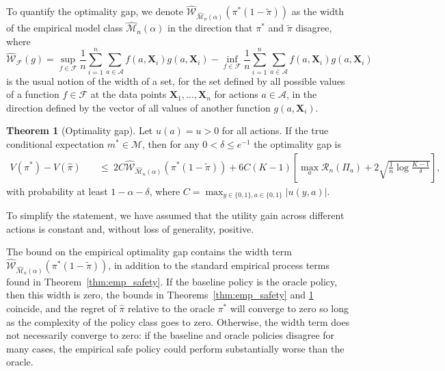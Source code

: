 \documentclass[12pt]{article}
\theoremstyle{definition}
\newtheorem{theorem}{Theorem}
\newcommand{\bX}{\bm X}
\newcommand{\<}{\langle}
\renewcommand{\>}{\rangle}
\newcommand\mcal[1]{\ensuremath{\mathcal{#1}}}
\begin{document}
To quantify the optimality gap, we denote
$\widehat{\mcal{W}}_{\widehat{\mcal{M}}_n(\alpha)}(\pi^\ast(1-\tilde{\pi}))$
as the width of the empirical
model class $\widehat{\mcal{M}}_n(\alpha)$ in the direction that
$\pi^\ast$ and $\tilde{\pi}$ disagree, where
\[
  \widehat{\mcal{W}}_\mcal{F}(g) = \sup_{f \in \mcal{F}} \frac{1}{n}\sum_{i=1}^n \sum_{a \in \mathcal{A}} f(a, \bX_i) g(a, \bX_i) - \inf_{f \in \mcal{F}} \frac{1}{n}\sum_{i=1}^n\sum_{a \in \mathcal{A}} f(a, \bX_i) g(a, \bX_i)
\]
is the usual notion of the width of a set, for the set defined by all
possible values of a function $f \in \mathcal{F}$ at the
data points $\bX_1,\dots,\bX_n$ for actions $a \in \mathcal{A}$, in the direction
defined by the vector of all values of another function $g(a, \bX_i)$.


\begin{theorem}[Optimality gap]
  \label{thm:emp_optimal_gap} \singlespacing
  Let $u(a) = u > 0$ for all actions.
  If the true conditional expectation $m^\ast \in \mcal{M}$, then for any $0 < \delta \leq e^{-1}$ the optimality gap is
  \[
    \begin{aligned}
      V(\pi^\ast) - V(\hat{\pi}) & 
      & \ \leq \ 2C \widehat{\mcal{W}}_{\widehat{\mcal{M}}_n(\alpha)}\left(\pi^\ast (1 - \tilde{\pi})\right)  +6 C (K-1) \left[\max_{a} \mathcal{R}_n(\Pi_a) + 2\sqrt{\frac{1}{n}\log \frac{K-1}{\delta}} \right],
    \end{aligned}
    \]
    with probability at least $1 - \alpha  - \delta$, where $C = \max_{y \in \{0,1\}, a \in \{0, 1\}} |u(y, a)|$.
\end{theorem}
\noindent To simplify the statement, we have assumed that the utility gain
across different actions is constant and, without loss of generality,
positive. 


The bound on the empirical
optimality gap contains the width term
$\widehat{\mcal{W}}_{\widehat{\mcal{M}}_n(\alpha)}\left(\pi^\ast (1 - \tilde{\pi})\right)$,
in addition to the standard empirical process terms found in Theorem~\ref{thm:emp_safety}.
If the baseline policy is the oracle policy, then
this width is zero, the bounds in Theorems~\ref{thm:emp_safety} and
\ref{thm:emp_optimal_gap} coincide,
and the regret of $\hat{\pi}$ relative to the oracle $\pi^\ast$ will converge
to zero so long as the complexity of the policy class goes to zero.
Otherwise, the width term does not necessarily converge to zero: if
the baseline and oracle policies disagree for many cases, the empirical safe
policy could perform substantially worse than the oracle.
\end{document}
